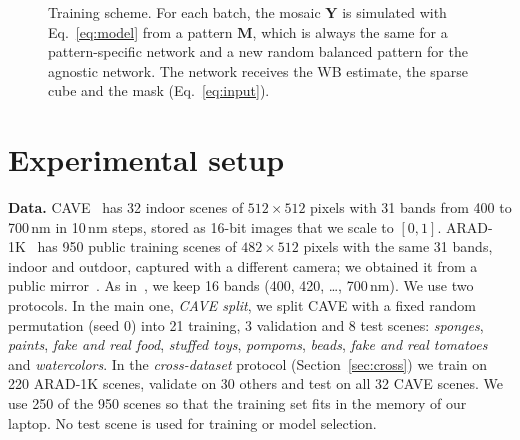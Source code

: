 \documentclass{article}
\def\X{{\mathbf X}}
\def\Y{{\mathbf Y}}
\def\M{{\mathbf M}}
\newcommand{\wb}{\mathrm{WB}}
\begin{document}
\begin{figure}[t]
\centering
{}
\caption{Training scheme. For each batch, the mosaic $\Y$ is simulated with
Eq.~\eqref{eq:model} from a pattern $\M$, which is always the same for a
pattern-specific network and a new random balanced pattern for the agnostic
network. The network receives the WB estimate, the sparse cube and the mask
(Eq.~\eqref{eq:input}).}
\label{fig:method}
\end{figure}

\section{Experimental setup}
\label{sec:setup}

\textbf{Data.} CAVE~\cite{yasuma2010} has 32 indoor scenes of
$512\times512$ pixels with 31 bands from 400 to 700\,nm in 10\,nm steps,
stored as 16-bit images that we scale to $[0,1]$. ARAD-1K~\cite{arad2022}
has 950 public training scenes of $482\times512$ pixels with the same 31
bands, indoor and outdoor, captured with a different camera; we obtained it
from a public mirror~\cite{he2023zenodo}. As in~\cite{diaz2023}, we keep 16
bands (400, 420, \dots, 700\,nm). We use two protocols. In the main one,
\emph{CAVE split}, we split CAVE with a fixed random permutation (seed 0)
into 21 training, 3 validation and 8 test scenes: \textit{sponges},
\textit{paints}, \textit{fake and real food}, \textit{stuffed toys},
\textit{pompoms}, \textit{beads}, \textit{fake and real tomatoes} and
\textit{watercolors}. In the \emph{cross-dataset} protocol
(Section~\ref{sec:cross}) we train on 220 ARAD-1K scenes, validate on 30
others and test on all 32 CAVE scenes. We use 250 of the 950 scenes so that
the training set fits in the memory of our laptop. No test scene is used for
training or model selection.
\end{document}
